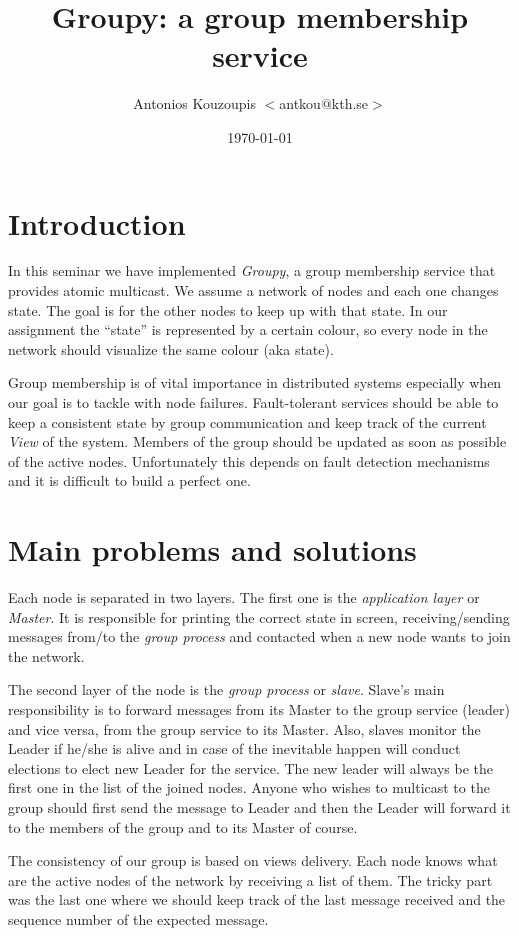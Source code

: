 \documentclass[a4paper, 11pt]{article}
\title{Groupy: a group membership service}
\author{Antonios Kouzoupis $<$antkou$@$kth.se$>$}
\date{\today{}}
\begin{document}
\maketitle

\section{Introduction}

In this seminar we have implemented \emph{Groupy}, a group membership service
that provides atomic multicast. We assume a network of nodes and each one
changes state. The goal is for the other nodes to keep up with that state. In
our assignment the ``state'' is represented by a certain colour, so every node in
the network should visualize the same colour (aka state).

Group membership is of vital importance in distributed systems especially when
our goal is to tackle with node failures. Fault-tolerant services should be able
to keep a consistent state by group communication and keep track of the
current \emph{View} of the system. Members of the group should be updated as
soon as possible of the active nodes. Unfortunately this depends on fault
detection mechanisms and it is difficult to build a perfect one.

\section{Main problems and solutions}

Each node is separated in two layers. The first one is the \emph{application
layer} or \emph{Master}. It is responsible for printing the correct state in
screen, receiving/sending messages from/to the \emph{group process} and
contacted when a new node wants to join the network.

The second layer of the node is the \emph{group process} or \emph{slave}.
Slave's main responsibility is to forward messages from its Master to the group
service (leader) and vice versa, from the group service to its Master. Also,
slaves monitor the Leader if he/she is alive and in case of the inevitable
happen will conduct elections to elect new Leader for the service. The new
leader will always be the first one in the list of the joined nodes. Anyone who
wishes to multicast to the group should first send the message to Leader and
then the Leader will forward it to the members of the group and to its Master of
course.

The consistency of our group is based on views delivery. Each node knows what
are the active nodes of the network by receiving a list of them. The tricky part
was the last one where we should keep track of the last message received and the
sequence number of the expected message.
\end{document}
